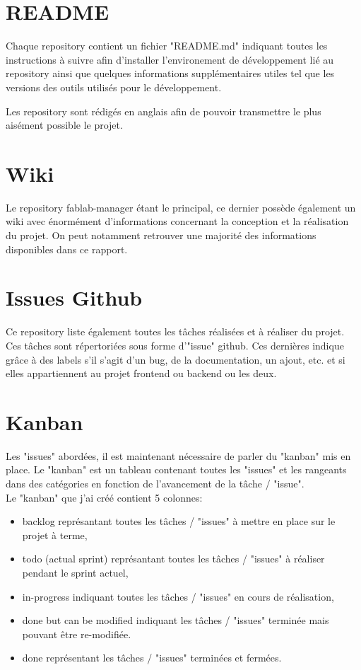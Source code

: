 \documentclass[
    iai, %
    il, %
]{heig-tb}
\begin{document}
\section{README}
Chaque \Gls{repository} contient un fichier "README.md" indiquant toutes les instructions à suivre afin d'installer l'environement de développement lié au \Gls{repository} ainsi que quelques informations supplémentaires utiles tel que les versions des outils utilisés pour le développement.

Les \Gls{repository} sont rédigés en anglais afin de pouvoir transmettre le plus aisément possible le projet.

\section{Wiki}
Le \Gls{repository} fablab-manager étant le principal, ce dernier possède également un wiki avec énormément d'informations concernant la conception et la réalisation du projet. On peut notamment retrouver une majorité des informations disponibles dans ce rapport.

\section{Issues Github}
Ce \Gls{repository} liste également toutes les tâches réalisées et à réaliser du projet. Ces tâches sont répertoriées sous forme d'"issue" \Gls{github}. Ces dernières indique grâce à des labels s'il s'agit d'un bug, de la documentation, un ajout, etc. et si elles appartiennent au projet \Gls {frontend} ou \Gls{backend} ou les deux.

\section{Kanban}
Les "issues" abordées, il est maintenant nécessaire de parler du "kanban" mis en place. Le "kanban" est un tableau contenant toutes les "issues" et les rangeants dans des catégories en fonction de l'avancement de la tâche / "issue". \\
Le "kanban" que j'ai créé contient 5 colonnes:
\begin{itemize}
    \item backlog représantant toutes les tâches / "issues" à mettre en place sur le projet à terme,
    \item todo (actual sprint) représantant toutes les tâches / "issues" à réaliser pendant le sprint actuel,
    \item in-progress indiquant toutes les tâches / "issues" en cours de réalisation,
    \item done but can be modified indiquant les tâches / "issues" terminée mais pouvant être re-modifiée.
    \item done représentant les tâches / "issues" terminées et fermées.
\end{itemize}
\end{document}
